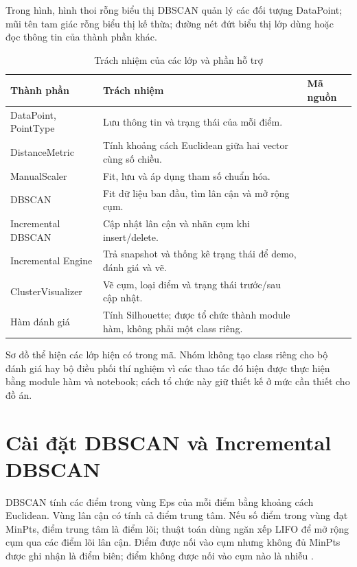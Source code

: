 Trong hình, hình thoi rỗng biểu thị DBSCAN quản lý các đối tượng DataPoint; mũi tên tam giác rỗng biểu thị kế thừa; đường nét đứt biểu thị lớp dùng hoặc đọc thông tin của thành phần khác.

\clearpage
\begin{table}[H]
\centering
\caption{Trách nhiệm của các lớp và phần hỗ trợ}
\label{tab:class_responsibilities}
\begin{tabularx}{\textwidth}{|P{3.2cm}|Y|P{4.2cm}|}\hline
\textbf{Thành phần} & \textbf{Trách nhiệm} & \textbf{Mã nguồn} \\\hline
DataPoint, PointType & Lưu thông tin và trạng thái của mỗi điểm. &  \\\hline
DistanceMetric & Tính khoảng cách Euclidean giữa hai vector cùng số chiều. &  \\\hline
ManualScaler & Fit, lưu và áp dụng tham số chuẩn hóa. &  \\\hline
DBSCAN & Fit dữ liệu ban đầu, tìm lân cận và mở rộng cụm. &  \\\hline
Incremental DBSCAN & Cập nhật lân cận và nhãn cụm khi insert/delete. &  \\\hline
Incremental Engine & Trả snapshot và thống kê trạng thái để demo, đánh giá và vẽ. &  \\\hline
ClusterVisualizer & Vẽ cụm, loại điểm và trạng thái trước/sau cập nhật. &  \\\hline
Hàm đánh giá & Tính Silhouette; được tổ chức thành module hàm, không phải một class riêng. &  \\\hline
\end{tabularx}
\end{table}

Sơ đồ thể hiện các lớp hiện có trong mã. Nhóm không tạo class riêng cho bộ đánh giá hay bộ điều phối thí nghiệm vì các thao tác đó hiện được thực hiện bằng module hàm và notebook; cách tổ chức này giữ thiết kế ở mức cần thiết cho đồ án.

\section{Cài đặt DBSCAN và Incremental DBSCAN}

DBSCAN tính các điểm trong vùng Eps của mỗi điểm bằng khoảng cách Euclidean. Vùng lân cận có tính cả điểm trung tâm. Nếu số điểm trong vùng đạt MinPts, điểm trung tâm là điểm lõi; thuật toán dùng ngăn xếp LIFO để mở rộng cụm qua các điểm lõi lân cận. Điểm được nối vào cụm nhưng không đủ MinPts được ghi nhận là điểm biên; điểm không được nối vào cụm nào là nhiễu \parencite{ester1996dbscan,ester1998incrementaldbscan}.


